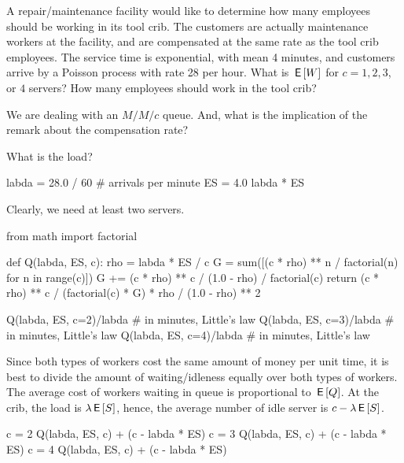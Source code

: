 \begin{exercise}[Hall 5.10]\label{ex:l-217} 
A repair/maintenance facility would like to determine how many employees should be working in its tool crib.
 The customers are actually maintenance workers at the facility, and are compensated at the same rate as the tool crib employees.
 The service time is exponential, with mean 4 minutes, and customers arrive by a Poisson process with rate 28 per hour.
 What is $\,\mathsf{E}\left[W\right]$ for $c=1, 2, 3$, or $4$ servers?
 How many employees should work in the tool crib?
\begin{hint}
We are dealing with an $M/M/c$ queue. And, what is the implication of the remark about the compensation rate?
\end{hint}
\begin{solution}
What is the load?
\begin{pyconsole}
labda = 28.0 / 60  # arrivals per minute
ES = 4.0
labda * ES
\end{pyconsole} 
Clearly, we need at least two servers.

\begin{pyconsole}
from math import factorial


def Q(labda, ES, c):
    rho = labda * ES / c
    G = sum([(c * rho) ** n / factorial(n) for n in range(c)])
    G += (c * rho) ** c / (1.0 - rho) / factorial(c)
    return (c * rho) ** c / (factorial(c) * G) * rho / (1.0 - rho) ** 2

Q(labda, ES, c=2)/labda  # in minutes, Little's law
Q(labda, ES, c=3)/labda  # in minutes, Little's law
Q(labda, ES, c=4)/labda  # in minutes, Little's law
\end{pyconsole} 


Since both types of workers cost the same amount of money per unit time, it is best to divide the amount of waiting/idleness equally over both types of workers.
The average cost of workers waiting in queue is proportional to $\,\mathsf{E}\left[Q\right]$.  At the crib, the load is $\lambda \,\mathsf{E}\left[S\right]$, hence, the average number of idle server is $c-\lambda \,\mathsf{E}\left[S\right]$.

\begin{pyconsole}
c = 2
Q(labda, ES, c) + (c - labda * ES)
c = 3
Q(labda, ES, c) + (c - labda * ES)
c = 4
Q(labda, ES, c) + (c - labda * ES)

\end{pyconsole} 
\end{solution}
\end{exercise}

